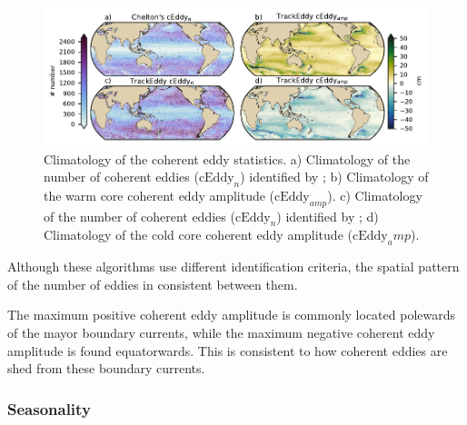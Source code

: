 \documentclass[draft,linenumbers]{agujournal2019}
\newcommand{\cEddy}{\textrm{cEddy}}
\begin{document}
	\begin{figure}
	    \centering
	    \includegraphics[width=1\textwidth]{figures/global_stats_polarity.pdf}
	    \caption{Climatology of the coherent eddy statistics. a) Climatology of the number of coherent eddies ($\cEddy_n$) identified by \citet{Chelton_Global_2007}; b) Climatology of the warm core coherent eddy amplitude ($\cEddy_{amp}$). c) Climatology of the number of coherent eddies ($\cEddy_n$) identified by \citet{Martinez_Kinetic_2019}; d) Climatology of the cold core coherent eddy amplitude ($\cEddy_amp$).}
	    \label{fig:eddy_stats_climatology}
	\end{figure}

	Although these algorithms use different identification criteria, the spatial pattern of the number of eddies in consistent between them.

	The maximum positive coherent eddy amplitude is commonly located polewards of the mayor boundary currents, while the maximum negative coherent eddy amplitude is found equatorwards. This is consistent to how coherent eddies are shed from these boundary currents.

	\subsubsection{Seasonality}
\end{document}
